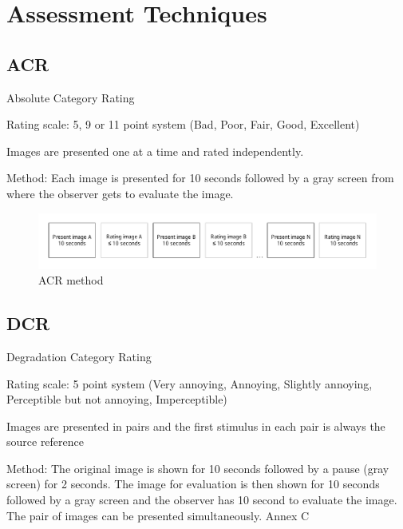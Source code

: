 \graphicspath{{Chapters/AssessmentTechniques/}}

\chapter{Assessment Techniques}

\section{ACR} %
\label{sec:acr}

Absolute Category Rating

Rating scale: 5, 9 or 11 point system (Bad, Poor, Fair, Good, Excellent)

Images are presented one at a time and rated independently.

Method: Each image is presented for 10 seconds followed by a gray screen from where the observer gets to evaluate the image.

\begin{figure}[H]
	\centering
	\includegraphics[width = \columnwidth]{Img/ACR}
	\caption{ACR method}
	\label{fig:acrMethod}
\end{figure}


\section{DCR} %
\label{sec:dcr}

Degradation Category Rating

Rating scale: 5 point system (Very annoying, Annoying, Slightly annoying, Perceptible but not annoying, Imperceptible)

Images are presented in pairs and the first stimulus in each pair is always the source reference

Method: The original image is shown for 10 seconds followed by a pause (gray screen) for 2 seconds. The image for evaluation is then shown for 10 seconds followed by a gray screen and the observer has 10 second to evaluate the image. The pair of images can be presented simultaneously. Annex C

